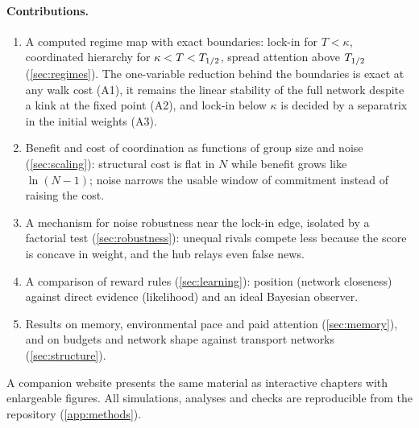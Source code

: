 \paragraph{Contributions.}
\begin{enumerate}[label=(\roman*)]
  \item A computed regime map with exact boundaries: lock-in for $T<\kappa$, coordinated hierarchy for
    $\kappa<T<T_{1/2}$, spread attention above $T_{1/2}$ (\cref{sec:regimes}). The one-variable reduction behind the
    boundaries is exact at any walk cost (A1), it remains the linear stability of the full network despite a kink at the
    fixed point (A2), and lock-in below $\kappa$ is decided by a separatrix in the initial weights (A3).
  \item Benefit and cost of coordination as functions of group size and noise (\cref{sec:scaling}): structural cost is
    flat in $N$ while benefit grows like $\ln(N-1)$; noise narrows the usable window of commitment instead of raising the
    cost.
  \item A mechanism for noise robustness near the lock-in edge, isolated by a factorial test (\cref{sec:robustness}):
    unequal rivals compete less because the score is concave in weight, and the hub relays even false news.
  \item A comparison of reward rules (\cref{sec:learning}): position (network closeness) against direct evidence
    (likelihood) and an ideal Bayesian observer.
  \item Results on memory, environmental pace and paid attention (\cref{sec:memory}), and on budgets and network shape
    against transport networks (\cref{sec:structure}).
\end{enumerate}

A companion website presents the same material as interactive chapters with enlargeable figures. All simulations,
analyses and checks are reproducible from the repository (\cref{app:methods}).
